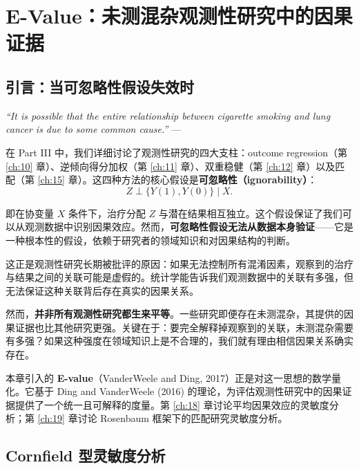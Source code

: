 
\chapter{E-Value：未测混杂观测性研究中的因果证据}\label{ch:17}

\section{引言：当可忽略性假设失效时}\label{sec:17-intro}

\textit{``It is possible that the entire relationship between cigarette smoking and lung cancer is due to some common cause.''}
--- \citep{Fisher1957}

在 Part III 中，我们详细讨论了观测性研究的四大支柱：outcome regression（第 \ref{ch:10} 章）、逆倾向得分加权（第 \ref{ch:11} 章）、双重稳健（第 \ref{ch:12} 章）以及匹配（第 \ref{ch:15} 章）。这四种方法的核心假设是\textbf{可忽略性（ignorability）}：
\begin{equation}
Z \perp \{Y(1), Y(0)\} \mid X .
\label{eq:17-ignorability}
\end{equation}

即在协变量 $X$ 条件下，治疗分配 $Z$ 与潜在结果相互独立。这个假设保证了我们可以从观测数据中识别因果效应。然而，\textbf{可忽略性假设无法从数据本身验证}——它是一种根本性的假设，依赖于研究者的领域知识和对因果结构的判断。

这正是观测性研究长期被批评的原因：如果无法控制所有混淆因素，观察到的治疗与结果之间的关联可能是虚假的。统计学能告诉我们观测数据中的关联有多强，但无法保证这种关联背后存在真实的因果关系。

然而，\textbf{并非所有观测性研究都生来平等}。一些研究即便存在未测混杂，其提供的因果证据也比其他研究更强。关键在于：要完全解释掉观察到的关联，未测混杂需要有多强？如果这种强度在领域知识上是不合理的，我们就有理由相信因果关系确实存在。

本章引入的 \textbf{E-value}（VanderWeele and Ding, 2017）正是对这一思想的数学量化。它基于 Ding and VanderWeele (2016) 的理论，为评估观测性研究中的因果证据提供了一个统一且可解释的度量。第 \ref{ch:18} 章讨论平均因果效应的灵敏度分析；第 \ref{ch:19} 章讨论 Rosenbaum 框架下的匹配研究灵敏度分析。

\section{Cornfield 型灵敏度分析}\label{sec:17-cornfield}

